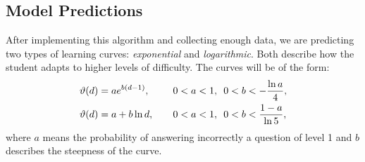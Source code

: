 \documentclass{article}
\newcommand{\0}{\mathbbold{0}}
\newcommand{\1}{\mathds{1}}
\newcommand{\2}{\mathbbold{2}}
\begin{document}
\subsection{Model Predictions}
After implementing this algorithm and collecting enough data, we are predicting two types of learning curves: \textsl{exponential} and \textsl{logarithmic}.
Both describe how the student adapts to higher levels of difficulty. The curves will be of the form:
\begin{alignat}{4}
    \vartheta(d) &= ae^{b(d-1)},\mkern20mu &0<a<1,~~&0<b<-\frac{\ln a}{4},\label{eqexp} \\
    \vartheta(d) &= a + b\ln d,\mkern20mu &0<a<1,~~&0<b<\frac{1-a}{\ln 5},\label{eqlog}
\end{alignat}
where $a$ means the probability of answering incorrectly a question of level 1 and $b$ describes the steepness of the curve.
\end{document}
